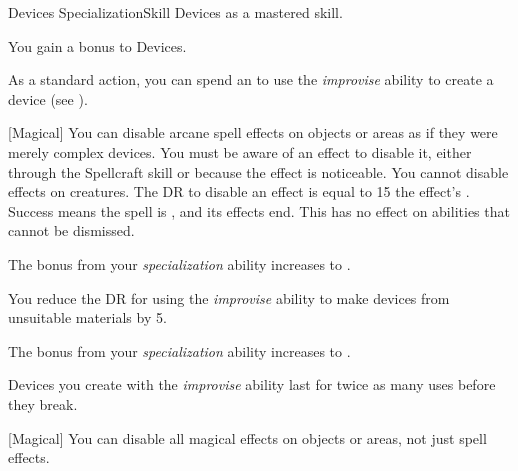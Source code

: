     \begin{feat}{Devices Specialization}{Skill}
        \featpre Devices as a mastered skill.

         You gain a  bonus to Devices.

         As a standard action, you can spend an  to use the \textit{improvise} ability to create a device (see ).

        [Magical] You can disable arcane spell effects on objects or areas as if they were merely complex devices.
        You must be aware of an effect to disable it, either through the Spellcraft skill or because the effect is noticeable.
        You cannot disable effects on creatures.
        The DR to disable an effect is equal to 15 \add the effect's .
        Success means the spell is , and its effects end.
        This has no effect on abilities that cannot be dismissed.

         The bonus from your \textit{specialization} ability increases to .

         You reduce the DR for using the \textit{improvise} ability to make devices from unsuitable materials by 5.

         The bonus from your \textit{specialization} ability increases to .

         Devices you create with the \textit{improvise} ability last for twice as many uses before they break.

        [Magical] You can disable all magical effects on objects or areas, not just spell effects.
    \end{feat}

